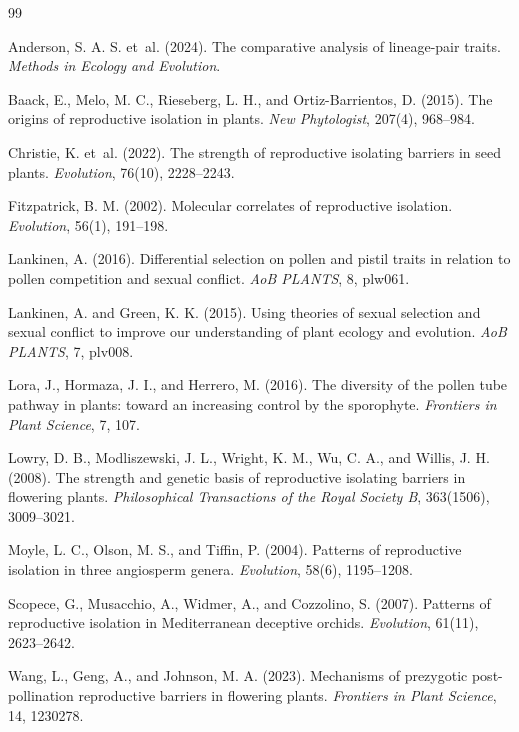 \documentclass[11pt]{article}
\begin{document}
\begin{thebibliography}{99}

Anderson, S. A. S. et~al. (2024).
\newblock The comparative analysis of lineage-pair traits.
\newblock \emph{Methods in Ecology and Evolution}.

Baack, E., Melo, M. C., Rieseberg, L. H., and Ortiz-Barrientos, D. (2015).
\newblock The origins of reproductive isolation in plants.
\newblock \emph{New Phytologist}, 207(4), 968--984.

Christie, K. et~al. (2022).
\newblock The strength of reproductive isolating barriers in seed plants.
\newblock \emph{Evolution}, 76(10), 2228--2243.

Fitzpatrick, B. M. (2002).
\newblock Molecular correlates of reproductive isolation.
\newblock \emph{Evolution}, 56(1), 191--198.

Lankinen, A. (2016).
\newblock Differential selection on pollen and pistil traits in relation to pollen competition and sexual conflict.
\newblock \emph{AoB PLANTS}, 8, plw061.

Lankinen, A. and Green, K. K. (2015).
\newblock Using theories of sexual selection and sexual conflict to improve our understanding of plant ecology and evolution.
\newblock \emph{AoB PLANTS}, 7, plv008.

Lora, J., Hormaza, J. I., and Herrero, M. (2016).
\newblock The diversity of the pollen tube pathway in plants: toward an increasing control by the sporophyte.
\newblock \emph{Frontiers in Plant Science}, 7, 107.

Lowry, D. B., Modliszewski, J. L., Wright, K. M., Wu, C. A., and Willis, J. H. (2008).
\newblock The strength and genetic basis of reproductive isolating barriers in flowering plants.
\newblock \emph{Philosophical Transactions of the Royal Society B}, 363(1506), 3009--3021.

Moyle, L. C., Olson, M. S., and Tiffin, P. (2004).
\newblock Patterns of reproductive isolation in three angiosperm genera.
\newblock \emph{Evolution}, 58(6), 1195--1208.

Scopece, G., Musacchio, A., Widmer, A., and Cozzolino, S. (2007).
\newblock Patterns of reproductive isolation in Mediterranean deceptive orchids.
\newblock \emph{Evolution}, 61(11), 2623--2642.

Wang, L., Geng, A., and Johnson, M. A. (2023).
\newblock Mechanisms of prezygotic post-pollination reproductive barriers in flowering plants.
\newblock \emph{Frontiers in Plant Science}, 14, 1230278.

\end{thebibliography}
\end{document}
